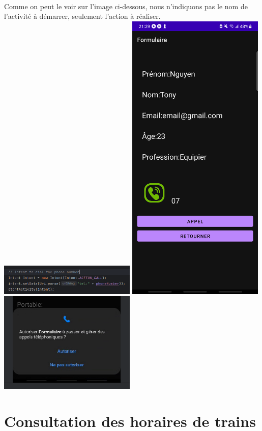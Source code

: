 \documentclass[a4paper]{article}
\begin{document}
\begin{multicols}{2}
      \paragraph{}
        Comme on peut le voir sur l'image ci-dessous, nous n'indiquons pas le nom de l'activité à démarrer, seulement l'action à réaliser.
      \includegraphics[width=0.49\textwidth]{implicit/implementation}
      \includegraphics[width=0.49\textwidth]{explicit/screenshotFormulaireAffichage}
      \includegraphics[width=0.49\textwidth]{implicit/appel}
  \section{Consultation des horaires de trains}

\end{multicols}
\end{document}
